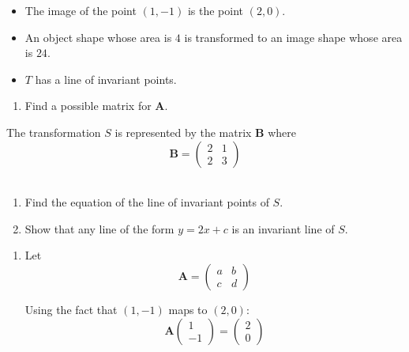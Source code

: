 \documentclass[leqno]{article}
\begin{document}
\begin{enumerate}[
  label=\textbf{\arabic*.},
  leftmargin=*,
  topsep=0pt,
  partopsep=0pt,
  parsep=0pt
]
\begin{itemize}
\item The image of the point $(1,-1)$ is the point $(2,0)$.
\item An object shape whose area is $4$ is transformed to an image shape whose area is $24$.
\item $T$ has a line of invariant points. \\
\end{itemize}

\begin{enumerate}[label=\textbf{(\roman*)}]
  \item Find a possible matrix for $\mathbf{A}$.  \\
\end{enumerate}

The transformation $S$ is represented by the matrix $\mathbf{B}$ where
\[
\mathbf{B} = \begin{pmatrix}2 & 1 \\ 2 & 3\end{pmatrix}
\] \\
\begin{enumerate}[label=\textbf{(\roman*)}, resume]
  \item Find the equation of the line of invariant points of $S$.  \\
  \item Show that any line of the form $y = 2x + c$ is an invariant line of $S$.  \\
\end{enumerate}

\vspace*{10pt}

\begin{djsSolution}
\begin{enumerate}[label=\textbf{(\roman*)}]
\item Let
\[
\mathbf A=\begin{pmatrix}a&b\\ c&d\end{pmatrix}
\]

Using the fact that $(1,-1)$ maps to $(2,0)$:
\[
\mathbf A\begin{pmatrix}1\\-1\end{pmatrix}
=
\begin{pmatrix}2\\0\end{pmatrix}
\]


\end{enumerate}
\end{djsSolution}
\end{enumerate}
\end{document}
